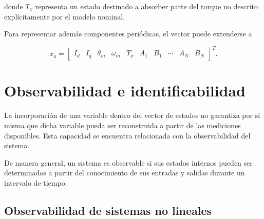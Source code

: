 donde $T_x$ representa un estado destinado a absorber parte del torque no 
descrito explícitamente por el modelo nominal.

Para representar además componentes periódicas, el vector puede extenderse a

\begin{equation}
\label{eq:vector_estados_aumentado1}
x_a =
\begin{bmatrix}
I_d &
I_q &
\theta_m &
\omega_m &
T_x &
A_1 &
B_1 &
\cdots &
A_N &
B_N
\end{bmatrix}^{T}.
\end{equation}

%
%
%



\section{Observabilidad e identificabilidad}

%

La incorporación de una variable dentro del vector de estados no garantiza 
por sí misma que dicha variable pueda ser reconstruida a partir de las 
mediciones disponibles. Esta capacidad se encuentra relacionada con la 
observabilidad del sistema.

De manera general, un sistema es observable si sus estados internos pueden 
ser determinados a partir del conocimiento de sus entradas y salidas durante 
un intervalo de tiempo.



\subsection{Observabilidad de sistemas no lineales}


